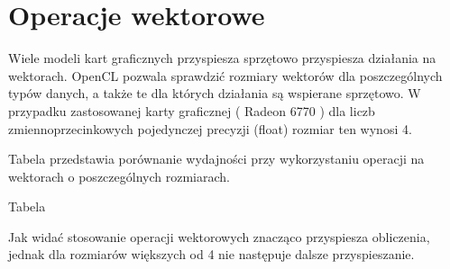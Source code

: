 
\section { Operacje wektorowe }

Wiele modeli kart graficznych przyspiesza sprzętowo przyspiesza działania na wektorach. OpenCL pozwala sprawdzić rozmiary wektorów dla poszczególnych typów danych, a także te dla których działania są wspierane sprzętowo. W przypadku zastosowanej karty graficznej ( Radeon 6770 ) dla liczb zmiennoprzecinkowych pojedynczej precyzji (float) rozmiar ten wynosi 4.

Tabela przedstawia porównanie wydajności przy wykorzystaniu operacji na wektorach o poszczególnych rozmiarach. \linebreak

Tabela \linebreak

Jak widać stosowanie operacji wektorowych znacząco przyspiesza obliczenia, jednak dla rozmiarów większych od 4 nie następuje dalsze przyspieszanie.
